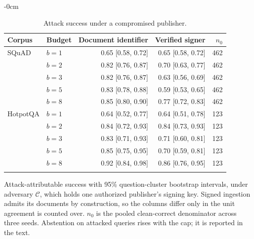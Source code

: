 \begin{table}[t]
\begin{adjustwidth}{-\extralength}{0cm}
\centering
\footnotesize
\setlength{\tabcolsep}{4pt}
\caption{Attack success under a compromised publisher.\label{tab:compromise}}
\begin{tabular}{llrrr}
\toprule
Corpus & Budget & Document identifier & Verified signer & $n_0$ \\
\midrule
SQuAD & $b=1$ & 0.65 [0.58, 0.72] & 0.65 [0.58, 0.72] & 462 \\
 & $b=2$ & 0.82 [0.76, 0.87] & 0.70 [0.63, 0.77] & 462 \\
 & $b=3$ & 0.82 [0.76, 0.87] & 0.63 [0.56, 0.69] & 462 \\
 & $b=5$ & 0.83 [0.78, 0.88] & 0.59 [0.53, 0.65] & 462 \\
 & $b=8$ & 0.85 [0.80, 0.90] & 0.77 [0.72, 0.83] & 462 \\
\addlinespace
HotpotQA & $b=1$ & 0.64 [0.52, 0.77] & 0.64 [0.51, 0.78] & 123 \\
 & $b=2$ & 0.84 [0.72, 0.93] & 0.84 [0.73, 0.93] & 123 \\
 & $b=3$ & 0.83 [0.71, 0.93] & 0.71 [0.60, 0.81] & 123 \\
 & $b=5$ & 0.85 [0.75, 0.95] & 0.70 [0.59, 0.81] & 123 \\
 & $b=8$ & 0.92 [0.84, 0.98] & 0.86 [0.76, 0.95] & 123 \\
\addlinespace
\bottomrule
\end{tabular}
\par\vspace{3pt}
\noindent\parbox{\linewidth}{\footnotesize Attack-attributable success with 95\% question-cluster bootstrap intervals, under adversary $\mathcal{C}$, which holds one authorized publisher's signing key. Signed ingestion admits its documents by construction, so the columns differ only in the unit agreement is counted over. $n_0$ is the pooled clean-correct denominator across three seeds. Abstention on attacked queries rises with the cap; it is reported in the text.}
\end{adjustwidth}
\end{table}